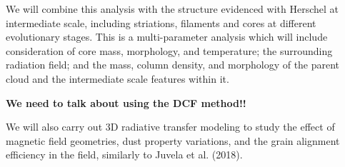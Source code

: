 \documentclass[11pt]{amsart}
\begin{document}
We will combine this analysis with the structure evidenced with Herschel
at intermediate scale, including striations, filaments and cores at different evolutionary stages.
This is a multi-parameter analysis which will include consideration of core mass, morphology, and temperature;
the surrounding radiation field; and the mass, column density, and morphology of the parent cloud and the intermediate scale features within it.

{\bf We need to talk about using the DCF method!!}

We will also carry out 3D radiative transfer modeling to study the effect of magnetic field geometries, dust property variations, and the grain alignment efficiency in the field, similarly to Juvela et al. (2018).
 
\end{document}
